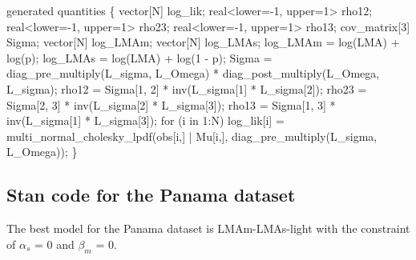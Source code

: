 \documentclass[
  12pt,
  letterpaper,
  DIV=11,
  numbers=noendperiod]{scrartcl}
\newenvironment{Shaded}{\begin{snugshade}}{\end{snugshade}}
\newcommand{\ControlFlowTok}[1]{\textcolor[rgb]{0.00,0.23,0.31}{#1}}
\newcommand{\DataTypeTok}[1]{\textcolor[rgb]{0.68,0.00,0.00}{#1}}
\newcommand{\DecValTok}[1]{\textcolor[rgb]{0.68,0.00,0.00}{#1}}
\newcommand{\KeywordTok}[1]{\textcolor[rgb]{0.00,0.23,0.31}{#1}}
\newcommand{\NormalTok}[1]{\textcolor[rgb]{0.00,0.23,0.31}{#1}}
\begin{document}
\begin{Shaded}
\begin{Highlighting}[]
\KeywordTok{generated quantities}\NormalTok{ \{}
  \DataTypeTok{vector}\NormalTok{[N] log\_lik;}
  \DataTypeTok{real}\NormalTok{\textless{}}\KeywordTok{lower}\NormalTok{={-}}\DecValTok{1}\NormalTok{, }\KeywordTok{upper}\NormalTok{=}\DecValTok{1}\NormalTok{\textgreater{} rho12;}
  \DataTypeTok{real}\NormalTok{\textless{}}\KeywordTok{lower}\NormalTok{={-}}\DecValTok{1}\NormalTok{, }\KeywordTok{upper}\NormalTok{=}\DecValTok{1}\NormalTok{\textgreater{} rho23;}
  \DataTypeTok{real}\NormalTok{\textless{}}\KeywordTok{lower}\NormalTok{={-}}\DecValTok{1}\NormalTok{, }\KeywordTok{upper}\NormalTok{=}\DecValTok{1}\NormalTok{\textgreater{} rho13;}
  \DataTypeTok{cov\_matrix}\NormalTok{[}\DecValTok{3}\NormalTok{] Sigma;}
  \DataTypeTok{vector}\NormalTok{[N] log\_LMAm;}
  \DataTypeTok{vector}\NormalTok{[N] log\_LMAs;}
\NormalTok{  log\_LMAm = log(LMA) + log(p);}
\NormalTok{  log\_LMAs = log(LMA) + log(}\DecValTok{1}\NormalTok{ {-} p);}
\NormalTok{  Sigma = diag\_pre\_multiply(L\_sigma, L\_Omega)}
\NormalTok{     * diag\_post\_multiply(L\_Omega\textquotesingle{}, L\_sigma);}
\NormalTok{  rho12 = Sigma[}\DecValTok{1}\NormalTok{, }\DecValTok{2}\NormalTok{] * inv(L\_sigma[}\DecValTok{1}\NormalTok{] * L\_sigma[}\DecValTok{2}\NormalTok{]);}
\NormalTok{  rho23 = Sigma[}\DecValTok{2}\NormalTok{, }\DecValTok{3}\NormalTok{] * inv(L\_sigma[}\DecValTok{2}\NormalTok{] * L\_sigma[}\DecValTok{3}\NormalTok{]);}
\NormalTok{  rho13 = Sigma[}\DecValTok{1}\NormalTok{, }\DecValTok{3}\NormalTok{] * inv(L\_sigma[}\DecValTok{1}\NormalTok{] * L\_sigma[}\DecValTok{3}\NormalTok{]);}
  \ControlFlowTok{for}\NormalTok{ (i }\ControlFlowTok{in} \DecValTok{1}\NormalTok{:N)}
\NormalTok{   log\_lik[i] = multi\_normal\_cholesky\_lpdf(obs[i,] | Mu[i,], diag\_pre\_multiply(L\_sigma, L\_Omega));}
\NormalTok{ \}}
\end{Highlighting}
\end{Shaded}

\subsection{Stan code for the Panama
dataset}\label{stan-code-for-the-panama-dataset}

The best model for the Panama dataset is LMAm-LMAs-light with the
constraint of \(\alpha_s\) = 0 and \(\beta_m\) = 0.
\end{document}
